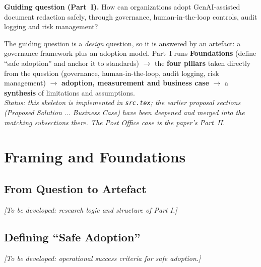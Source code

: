 \documentclass[12pt,a4paper]{article}
\begin{document}
\begin{quotebox}
\textbf{Guiding question (Part~I).} How can organizations adopt GenAI-assisted document redaction safely, through governance, human-in-the-loop controls, audit logging and risk management?
\end{quotebox}

\begin{tcolorbox}[
  enhanced, breakable, colback=gray!6, colframe=gray!40, boxrule=0.6pt, arc=2pt,
  left=8pt, right=8pt, top=5pt, bottom=5pt,
  title={\bfseries How Part~I is built},
  coltitle=gray!60!black,
  attach boxed title to top left={yshift=-2mm, xshift=6mm},
  boxed title style={colback=gray!15, arc=2pt, boxrule=0.6pt, colframe=gray!40},
]
The guiding question is a \emph{design} question, so it is answered by an artefact: a governance framework plus an adoption model. Part~I runs \textbf{Foundations} (define ``safe adoption'' and anchor it to standards) $\rightarrow$ the \textbf{four pillars} taken directly from the question (governance, human-in-the-loop, audit logging, risk management) $\rightarrow$ \textbf{adoption, measurement and business case} $\rightarrow$ a \textbf{synthesis} of limitations and assumptions.\\[4pt]
\textit{Status: this skeleton is implemented in \texttt{src.tex}; the earlier proposal sections (Proposed Solution $\ldots$ Business Case) have been deepened and merged into the matching subsections there. The Post Office case is the paper's Part~II.}
\end{tcolorbox}

\section{Framing and Foundations}

\subsection{From Question to Artefact}
\textit{[To be developed: research logic and structure of Part I.]}

\subsection{Defining ``Safe Adoption''}
\textit{[To be developed: operational success criteria for safe adoption.]}
\end{document}
